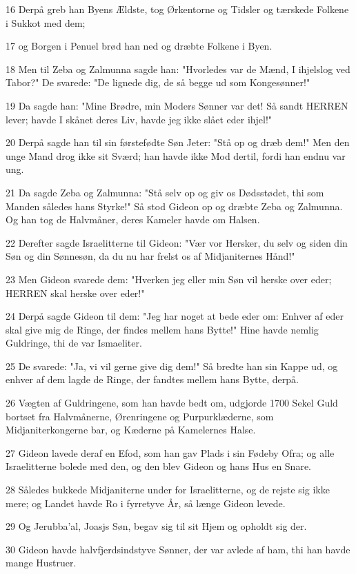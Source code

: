\par 16 Derpå greb han Byens Ældste, tog Ørkentorne og Tidsler og tærskede Folkene i Sukkot med dem;
\par 17 og Borgen i Penuel brød han ned og dræbte Folkene i Byen.
\par 18 Men til Zeba og Zalmunna sagde han: "Hvorledes var de Mænd, I ihjelslog ved Tabor?" De svarede: "De lignede dig, de så begge ud som Kongesønner!"
\par 19 Da sagde han: "Mine Brødre, min Moders Sønner var det! Så sandt HERREN lever; havde I skånet deres Liv, havde jeg ikke slået eder ihjel!"
\par 20 Derpå sagde han til sin førstefødte Søn Jeter: "Stå op og dræb dem!" Men den unge Mand drog ikke sit Sværd; han havde ikke Mod dertil, fordi han endnu var ung.
\par 21 Da sagde Zeba og Zalmunna: "Stå selv op og giv os Dødsstødet, thi som Manden således hans Styrke!" Så stod Gideon op og dræbte Zeba og Zalmunna. Og han tog de Halvmåner, deres Kameler havde om Halsen.
\par 22 Derefter sagde Israelitterne til Gideon: "Vær vor Hersker, du selv og siden din Søn og din Sønnesøn, da du nu har frelst os af Midjaniternes Hånd!"
\par 23 Men Gideon svarede dem: "Hverken jeg eller min Søn vil herske over eder; HERREN skal herske over eder!"
\par 24 Derpå sagde Gideon til dem: "Jeg har noget at bede eder om: Enhver af eder skal give mig de Ringe, der findes mellem hans Bytte!" Hine havde nemlig Guldringe, thi de var Ismaeliter.
\par 25 De svarede: "Ja, vi vil gerne give dig dem!" Så bredte han sin Kappe ud, og enhver af dem lagde de Ringe, der fandtes mellem hans Bytte, derpå.
\par 26 Vægten af Guldringene, som han havde bedt om, udgjorde 1700 Sekel Guld bortset fra Halvmånerne, Ørenringene og Purpurklæderne, som Midjaniterkongerne bar, og Kæderne på Kamelernes Halse.
\par 27 Gideon lavede deraf en Efod, som han gav Plads i sin Fødeby Ofra; og alle Israelitterne bolede med den, og den blev Gideon og hans Hus en Snare.
\par 28 Således bukkede Midjaniterne under for Israelitterne, og de rejste sig ikke mere; og Landet havde Ro i fyrretyve År, så længe Gideon levede.
\par 29 Og Jerubba'al, Joasjs Søn, begav sig til sit Hjem og opholdt sig der.
\par 30 Gideon havde halvfjerdsindstyve Sønner, der var avlede af ham, thi han havde mange Hustruer.
